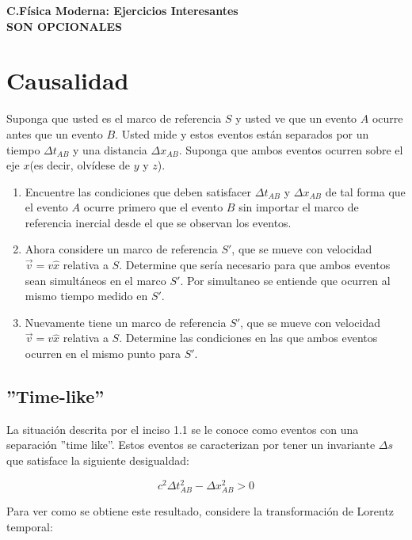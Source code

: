 \documentclass[12pt]{article}
\begin{document}
 
\begin{center}
\Large \textbf{C.Física Moderna: Ejercicios Interesantes}\\
\large \textbf{SON OPCIONALES}\\
\end{center}
 
\section{Causalidad} 
 
Suponga que usted es el marco de referencia $S$ y usted ve que un evento $A$ ocurre antes que un evento $B$. Usted mide y estos eventos están separados por un tiempo $\Delta t_{AB}$ y una distancia $\Delta x_{AB}$. Suponga que ambos eventos ocurren sobre el eje $x$(es decir, olvídese de $y$ y $z$).

\begin{enumerate}
	\item Encuentre las condiciones que deben satisfacer $\Delta t_{AB}$ y $\Delta x_{AB}$ de tal forma que el evento $A$ ocurre primero que el evento $B$ sin importar el marco de referencia inercial desde el que se observan los eventos.
	\item Ahora considere un marco de referencia $S'$, que se mueve con velocidad $\vec{v} = v \hat{x}$ relativa a $S$. Determine que sería necesario para que ambos eventos sean simultáneos en el marco $S'$. Por simultaneo se entiende que ocurren al mismo tiempo medido en $S'$.
	\item Nuevamente tiene un marco de referencia $S'$, que se mueve con velocidad $\vec{v} = v \hat{x}$ relativa a $S$. Determine las condiciones en las que ambos eventos ocurren en el mismo punto para $S'$. 
\end{enumerate}
 

\subsection{''Time-like''}

La situación descrita por el inciso 1.1 se le conoce como eventos con una separación ''time like''. Estos eventos se caracterizan por tener un invariante $\Delta s$ que satisface la siguiente desigualdad:



\begin{equation}
c^2 \Delta t_{AB}^2 - \Delta x_{AB}^2 > 0
\end{equation}

Para ver como se obtiene este resultado, considere la transformación de Lorentz temporal:
\end{document}
